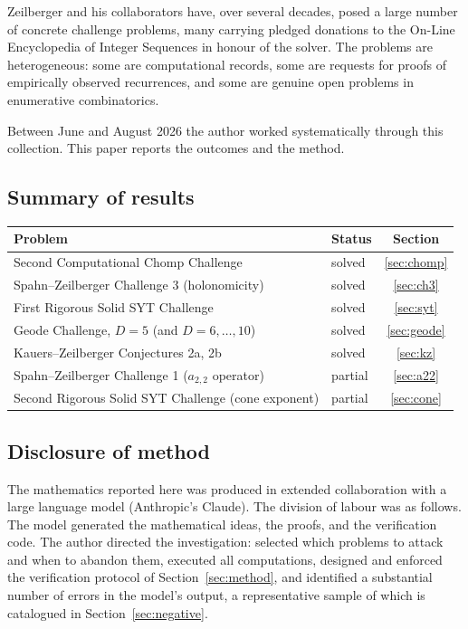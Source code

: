 \documentclass[11pt]{article}
\theoremstyle{definition}
\begin{document}
Zeilberger and his collaborators have, over several decades, posed a large
number of concrete challenge problems, many carrying pledged donations to the
On-Line Encyclopedia of Integer Sequences in honour of the solver. The problems
are heterogeneous: some are computational records, some are requests for proofs
of empirically observed recurrences, and some are genuine open problems in
enumerative combinatorics.

Between June and August 2026 the author worked systematically through this
collection. This paper reports the outcomes and the method.

\subsection{Summary of results}

\begin{center}
\begin{tabular}{llc}
\toprule
Problem & Status & Section\\
\midrule
Second Computational Chomp Challenge & solved & \ref{sec:chomp}\\
Spahn--Zeilberger Challenge 3 (holonomicity) & solved & \ref{sec:ch3}\\
First Rigorous Solid SYT Challenge & solved & \ref{sec:syt}\\
Geode Challenge, $D=5$ (and $D=6,\dots,10$) & solved & \ref{sec:geode}\\
Kauers--Zeilberger Conjectures 2a, 2b & solved & \ref{sec:kz}\\
Spahn--Zeilberger Challenge 1 ($a_{2,2}$ operator) & partial & \ref{sec:a22}\\
Second Rigorous Solid SYT Challenge (cone exponent) & partial & \ref{sec:cone}\\
\bottomrule
\end{tabular}
\end{center}

\subsection{Disclosure of method}\label{sec:disclosure}

The mathematics reported here was produced in extended collaboration with a
large language model (Anthropic's Claude). The division of labour was as
follows. The model generated the mathematical ideas, the proofs, and the
verification code. The author directed the investigation: selected which
problems to attack and when to abandon them, executed all computations,
designed and enforced the verification protocol of
Section~\ref{sec:method}, and identified a substantial number of errors in the
model's output, a representative sample of which is catalogued in
Section~\ref{sec:negative}.
\end{document}
